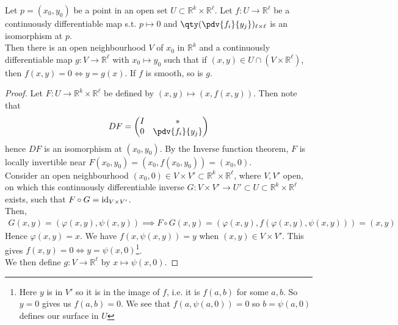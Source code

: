 \begin{theorem}
	Let $p = (x_0, y_0)$ be a point in an open set $U \subset \mathbb R^k \times \mathbb R^\ell$.
	Let $f \colon U \to \mathbb R^\ell$ be a continuously differentiable map s.t. $p \mapsto 0$ and $\qty(\pdv{f_i}{y_j})_{\ell \times \ell}$ is an isomorphism at $p$. \\
	Then there is an open neighbourhood $V$ of $x_0$ in $\mathbb R^k$ and a continuously differentiable map $g \colon V \to \mathbb R^\ell$ with $x_0 \mapsto y_0$ such that if $(x,y) \in U \cap (V \times \mathbb R^\ell)$, then $f(x,y)=0 \iff y=g(x)$.
	If $f$ is smooth, so is $g$.
\end{theorem}

\begin{proof}
	Let $F \colon U \to \mathbb R^k \times \mathbb R^\ell$ be defined by $(x,y) \mapsto (x,f(x,y))$.
	Then note that
	\begin{align*}
		DF = \begin{pmatrix}
			I & \ast           \\
			0 & \pdv{f_i}{y_j}
		\end{pmatrix}
	\end{align*}
	hence $DF$ is an isomorphism at $(x_0, y_0)$.
	By the Inverse function theorem, $F$ is locally invertible near $F(x_0,y_0) = (x_0,f(x_0,y_0)) = (x_0, 0)$. \\
	Consider an open neighbourhood $(x_0, 0) \in V \times V' \subset \mathbb R^k \times \mathbb R^\ell$, where $V, V'$ open, on which this continuously differentiable inverse $G \colon V \times V' \to U' \subset U \subset \mathbb R^k \times \mathbb R^\ell$ exists, such that $F \circ G = \operatorname{id}_{V \times V'}$. \\
	Then,
	\begin{align*}
		G(x,y) = (\varphi(x,y), \psi(x,y)) \implies F \circ G(x,y) = (\varphi(x,y), f(\varphi(x,y), \psi(x,y))) = (x,y)
	\end{align*}
	Hence $\varphi(x,y) = x$.
	We have $f(x,\psi(x,y)) = y$ when $(x,y) \in V \times V'$.
	This gives $f(x,y) = 0 \iff y = \psi(x,0)$\footnote{Here $y$ is in $V'$ so it is in the image of $f$, i.e. it is $f(a, b)$ for some $a, b$. So $y = 0$ gives us $f(a, b) = 0$. We see that $f(a, \psi(a, 0)) = 0$ so $b = \psi(a, 0)$ defines our surface in $U$}. \\
	We then define $g \colon V \to \mathbb R^\ell$ by $x \mapsto \psi(x,0)$.
\end{proof}


